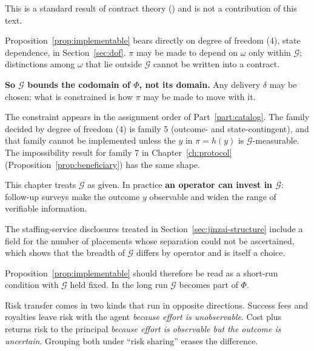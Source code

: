 This is a standard result of contract theory (\cite{holmstrom1979}) and is not a
contribution of this text.

\begin{remark}
\label{rem:G-limits-dof4}
Proposition~\ref{prop:implementable} bears directly on degree of freedom (4), state
dependence, in Section~\ref{sec:dof}. $\pi$ may be made to depend on $\omega$ only within
$\mathcal{G}$; distinctions among $\omega$ that lie outside $\mathcal{G}$ cannot be written
into a contract.

\textbf{So $\mathcal{G}$ bounds the codomain of $\Phi$, not its domain.} Any delivery
$\delta$ may be chosen; what is constrained is how $\pi$ may be made to move with it.

The constraint appears in the assignment order of Part~\ref{part:catalog}. The family
decided by degree of freedom (4) is family 5 (outcome- and state-contingent), and that family
cannot be implemented unless the $y$ in $\pi=h(y)$ is $\mathcal{G}$-measurable. The
impossibility result for family 7 in Chapter~\ref{ch:protocol}
(Proposition~\ref{prop:beneficiary}) has the same shape.
\end{remark}

\begin{remark}
\label{rem:G-endogenous}
This chapter treats $\mathcal{G}$ as given. In practice \textbf{an operator can invest in
$\mathcal{G}$}: follow-up surveys make the outcome $y$ observable and widen the range of
verifiable information.

The staffing-service disclosures treated in Section~\ref{sec:jinzai-structure} include a
field for the number of placements whose separation could not be ascertained, which shows
that the breadth of $\mathcal{G}$ differs by operator and is itself a choice.

Proposition~\ref{prop:implementable} should therefore be read as a short-run condition with
$\mathcal{G}$ held fixed. In the long run $\mathcal{G}$ becomes part of $\Phi$.
\end{remark}

\begin{remark}
Risk transfer comes in two kinds that run in opposite directions. Success fees and
royalties leave risk with the agent \emph{because effort is unobservable}. Cost plus returns
risk to the principal \emph{because effort is observable but the outcome is uncertain}.
Grouping both under ``risk sharing'' erases the difference.
\end{remark}

